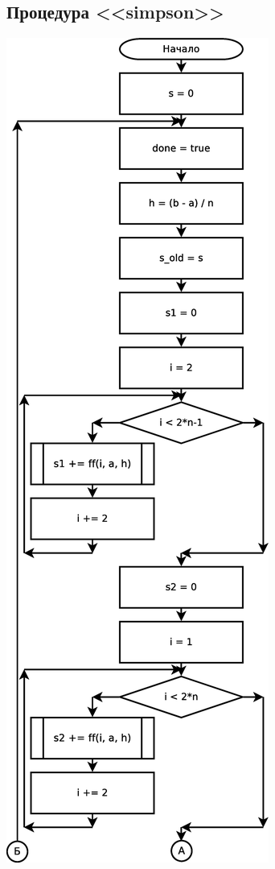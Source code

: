 \documentclass[a4paper]{article}
\begin{document}
\subsection{Процедура <<simpson>>}
\includegraphics[scale=0.35]{schemes/simpson1}
\end{document}
